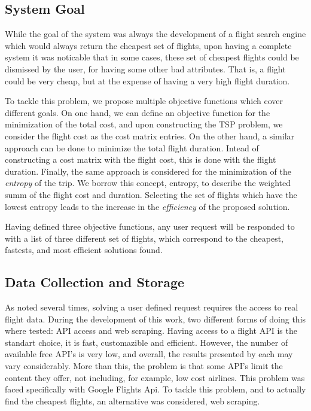 \subsection{System Goal}
While the goal of the system was always the development of a flight search engine which would 
always return the cheapest set of flights, upon having a complete system it was noticable 
that in some cases, these set of cheapest flights could be dismissed by the user,
for having some other bad attributes. That is, a flight could be very cheap, but at the expense 
of having a very high flight duration.

To tackle this problem, we propose multiple objective functions which cover different goals.
On one hand, we can define an objective function for the minimization of the total cost,
and upon constructing the TSP problem, we consider the flight cost as the cost matrix entries.
On the other hand, a similar approach can be done to minimize the total flight duration.
Intead of constructing a cost matrix with the flight cost, this is done with the flight duration.
Finally, the same approach is considered for the minimization of the \textit{entropy} of the trip.
We borrow this concept, entropy, to describe the weighted summ of the flight cost and duration.
Selecting the set of flights which have the lowest entropy leads to the increase 
in the \textit{efficiency} of the proposed solution.

Having defined three objective functions, any user request will be responded to with a list 
of three different set of flights, which correspond to the cheapest, fastests, and most efficient solutions found.



\subsection{Data Collection and Storage}
As noted several times, solving a user defined request requires the access to real flight data. 
During the development of this work, two different forms of doing this where tested:
API access and web scraping.
Having access to a flight API is the standart choice, it is fast, customazible and efficient.
However, the number of available free API's is very low,
and overall, the results presented by each may vary considerably.
More than this, the problem is that some API's limit the content they offer,
not including, for example, low cost airlines. This problem was faced specifically with Google Flights Api.
To tackle this problem, and to actually find the cheapest flights,
an alternative was considered, web scraping.

